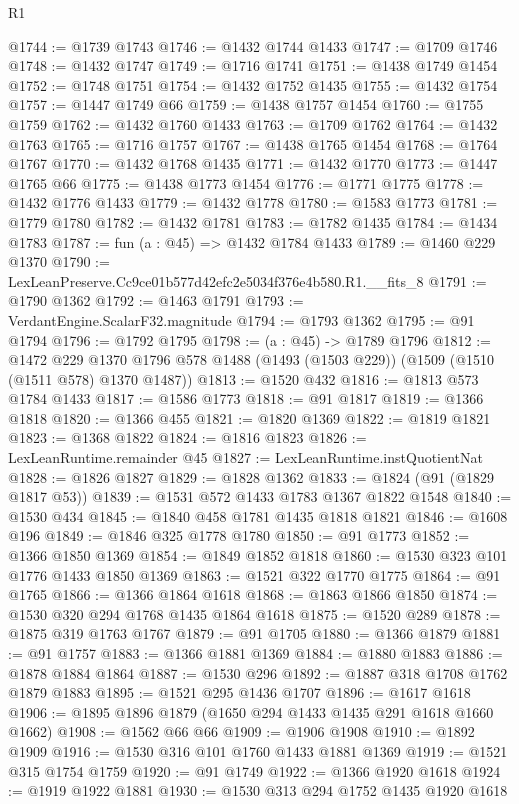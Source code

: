 \begin{lexlean}{R1}
\begin{coremodule}
@1744 := @1739 @1743
@1746 := @1432 @1744 @1433
@1747 := @1709 @1746
@1748 := @1432 @1747
@1749 := @1716 @1741
@1751 := @1438 @1749 @1454
@1752 := @1748 @1751
@1754 := @1432 @1752 @1435
@1755 := @1432 @1754
@1757 := @1447 @1749 @66
@1759 := @1438 @1757 @1454
@1760 := @1755 @1759
@1762 := @1432 @1760 @1433
@1763 := @1709 @1762
@1764 := @1432 @1763
@1765 := @1716 @1757
@1767 := @1438 @1765 @1454
@1768 := @1764 @1767
@1770 := @1432 @1768 @1435
@1771 := @1432 @1770
@1773 := @1447 @1765 @66
@1775 := @1438 @1773 @1454
@1776 := @1771 @1775
@1778 := @1432 @1776 @1433
@1779 := @1432 @1778
@1780 := @1583 @1773
@1781 := @1779 @1780
@1782 := @1432 @1781
@1783 := @1782 @1435
@1784 := @1434 @1783
@1787 := fun (a : @45) => @1432 @1784 @1433
@1789 := @1460 @229 @1370
@1790 := LexLeanPreserve.Cc9ce01b577d42efc2e5034f376e4b580.R1.__fits_8
@1791 := @1790 @1362
@1792 := @1463 @1791
@1793 := VerdantEngine.ScalarF32.magnitude
@1794 := @1793 @1362
@1795 := @91 @1794
@1796 := @1792 @1795
@1798 := (a : @45) -> @1789 @1796
@1812 := @1472
    @229
    @1370
    @1796
    @578
    @1488
    (@1493 (@1503 @229))
    (@1509 (@1510 (@1511 @578) @1370 @1487))
@1813 := @1520 @432
@1816 := @1813 @573 @1784 @1433
@1817 := @1586 @1773
@1818 := @91 @1817
@1819 := @1366 @1818
@1820 := @1366 @455
@1821 := @1820 @1369
@1822 := @1819 @1821
@1823 := @1368 @1822
@1824 := @1816 @1823
@1826 := LexLeanRuntime.remainder @45
@1827 := LexLeanRuntime.instQuotientNat
@1828 := @1826 @1827
@1829 := @1828 @1362
@1833 := @1824 (@91 (@1829 @1817 @53))
@1839 := @1531 @572 @1433 @1783 @1367 @1822 @1548
@1840 := @1530 @434
@1845 := @1840 @458 @1781 @1435 @1818 @1821
@1846 := @1608 @196
@1849 := @1846 @325 @1778 @1780
@1850 := @91 @1773
@1852 := @1366 @1850 @1369
@1854 := @1849 @1852 @1818
@1860 := @1530 @323 @101 @1776 @1433 @1850 @1369
@1863 := @1521 @322 @1770 @1775
@1864 := @91 @1765
@1866 := @1366 @1864 @1618
@1868 := @1863 @1866 @1850
@1874 := @1530 @320 @294 @1768 @1435 @1864 @1618
@1875 := @1520 @289
@1878 := @1875 @319 @1763 @1767
@1879 := @91 @1705
@1880 := @1366 @1879
@1881 := @91 @1757
@1883 := @1366 @1881 @1369
@1884 := @1880 @1883
@1886 := @1878 @1884 @1864
@1887 := @1530 @296
@1892 := @1887 @318 @1708 @1762 @1879 @1883
@1895 := @1521 @295 @1436 @1707
@1896 := @1617 @1618
@1906 := @1895 @1896 @1879 (@1650 @294 @1433 @1435 @291 @1618 @1660 @1662)
@1908 := @1562 @66 @66
@1909 := @1906 @1908
@1910 := @1892 @1909
@1916 := @1530 @316 @101 @1760 @1433 @1881 @1369
@1919 := @1521 @315 @1754 @1759
@1920 := @91 @1749
@1922 := @1366 @1920 @1618
@1924 := @1919 @1922 @1881
@1930 := @1530 @313 @294 @1752 @1435 @1920 @1618

\end{coremodule}
\end{lexlean}
